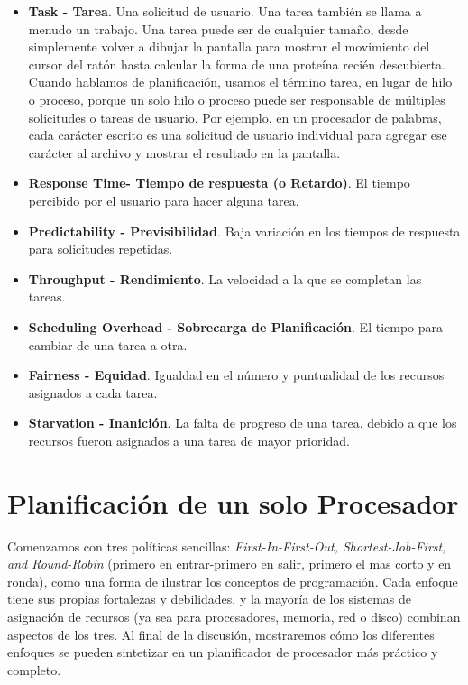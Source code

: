 \documentclass[10pt]{book}
\begin{document}
\begin{itemize}
\item \textbf{Task - Tarea}. Una solicitud de usuario. Una tarea también se llama a menudo un trabajo. Una tarea puede ser de cualquier tamaño, desde simplemente volver a dibujar la pantalla para mostrar el movimiento del cursor del ratón hasta calcular la forma de una proteína recién descubierta. Cuando hablamos de planificación, usamos el término tarea, en lugar de hilo o proceso, porque un solo hilo o proceso puede ser responsable de múltiples solicitudes o tareas de usuario. Por ejemplo, en un procesador de palabras, cada carácter escrito es una solicitud de usuario individual para agregar ese carácter al archivo y mostrar el resultado en la pantalla.
\item \textbf{Response Time- Tiempo de respuesta (o Retardo)}. El tiempo percibido por el usuario para hacer alguna tarea.
\item \textbf{Predictability - Previsibilidad}. Baja variación en los tiempos de respuesta para solicitudes repetidas.
\item \textbf{Throughput - Rendimiento}. La velocidad a la que se completan las tareas.
\item \textbf{Scheduling Overhead - Sobrecarga de Planificación}. El tiempo para cambiar de una tarea a otra.
\item \textbf{Fairness - Equidad}. Igualdad en el número y puntualidad de los recursos asignados a cada tarea.
\item \textbf{Starvation - Inanición}. La falta de progreso de una tarea, debido a que los recursos fueron asignados a una tarea de mayor prioridad.
\end{itemize}

\section{Planificación de un solo Procesador}
Comenzamos con tres políticas sencillas: \textit{First-In-First-Out, Shortest-Job-First, and Round-Robin} (primero en entrar-primero en salir, primero el mas corto y en ronda), como una forma de ilustrar los conceptos de programación. Cada enfoque tiene sus propias fortalezas y debilidades, y la mayoría de los sistemas de asignación de recursos (ya sea para procesadores, memoria, red o disco) combinan aspectos de los tres. Al final de la discusión, mostraremos cómo los diferentes enfoques se pueden sintetizar en un planificador de procesador más práctico y completo.
\end{document}
